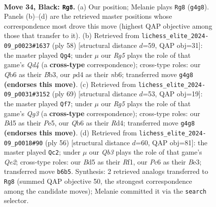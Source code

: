 \documentclass[11pt]{article}
\begin{document}
\clearpage

\begin{figure}[p]\centering
\begin{subfigure}{0.46\textwidth}\centering
\resizebox{\linewidth}{!}{%
\newchessgame
\chessboard[
  setfen={1rk5/p4p1p/1qp5/2Nb4/3P2r1/4Q1PP/5P2/2R3K1 b - - 0 34},
  showmover=false,
  pgfstyle=straightmove, color=movearrow, markmove={g4-g8}
]}
\caption{}
\end{subfigure}\hfill
\begin{subfigure}{0.46\textwidth}\centering
\resizebox{\linewidth}{!}{%
\newchessgame
\chessboard[
  setfen={7r/p1q2pk1/1n4p1/4p3/3Q3P/1B6/P4P2/3R2K1 w - - 0 30},
  showmover=false,
  pgfstyle=straightmove, color=movearrow, markmove={d4-g4}
]}
\caption{}
\end{subfigure}
\\[4pt]
\begin{subfigure}{0.46\textwidth}\centering
\resizebox{\linewidth}{!}{%
\newchessgame
\chessboard[
  setfen={3r2k1/6p1/4p1q1/4p2p/3rN3/P4P2/1P2Q1PP/1KR5 b - - 0 35},
  showmover=false,
  pgfstyle=straightmove, color=movearrow, markmove={g6-f7}
]}
\caption{}
\end{subfigure}\hfill
\begin{subfigure}{0.46\textwidth}\centering
\resizebox{\linewidth}{!}{%
\newchessgame
\chessboard[
  setfen={2r5/1k3p2/4pP2/p2r4/1qp4P/2RnB1PK/1P2Q3/5R2 w - - 6 29},
  showmover=false,
  pgfstyle=straightmove, color=movearrow, markmove={e2-c2}
]}
\caption{}
\end{subfigure}
\caption{\textbf{Move 34, Black: \texttt{Rg8}.} (a) Our position; Melanie plays \texttt{Rg8} (\texttt{g4g8}). Panels (b)--(d) are the retrieved master positions whose correspondence most drove this move (highest QAP objective among those that transfer to it). (b) Retrieved from \texttt{lichess\_elite\_2024-09\_p0023\#1637} (ply 58) [structural distance $d$=59, QAP obj=31]: the master played \texttt{Qg4}; under $\mu$ our \emph{Rg5} plays the role of that game's \emph{Qd4} (a \textbf{cross-type} correspondence); cross-type roles: our \emph{Q}b6 as their \emph{B}b3, our \emph{p}d4 as their \emph{n}b6; transferred move \texttt{g4g8} \textbf{(endorses this move)}. (c) Retrieved from \texttt{lichess\_elite\_2024-09\_p0031\#3152} (ply 69) [structural distance $d$=53, QAP obj=19]: the master played \texttt{Qf7}; under $\mu$ our \emph{Rg5} plays the role of that game's \emph{Qg3} (a \textbf{cross-type} correspondence); cross-type roles: our \emph{B}d5 as their \emph{P}e5, our \emph{Q}b6 as their \emph{R}d4; transferred move \texttt{g4g8} \textbf{(endorses this move)}. (d) Retrieved from \texttt{lichess\_elite\_2024-09\_p0018\#90} (ply 56) [structural distance $d$=60, QAP obj=81]: the master played \texttt{Qc2}; under $\mu$ our \emph{Qb3} plays the role of that game's \emph{Qe2}; cross-type roles: our \emph{B}d5 as their \emph{R}f1, our \emph{P}c6 as their \emph{B}e3; transferred move \texttt{b6b5}. Synthesis: 2 retrieved analogs transferred to \texttt{Rg8} (summed QAP objective 50, the strongest correspondence among the candidate moves); Melanie committed it via the \texttt{search} selector.}
\label{fig:thought-m67}
\end{figure}
\end{document}
